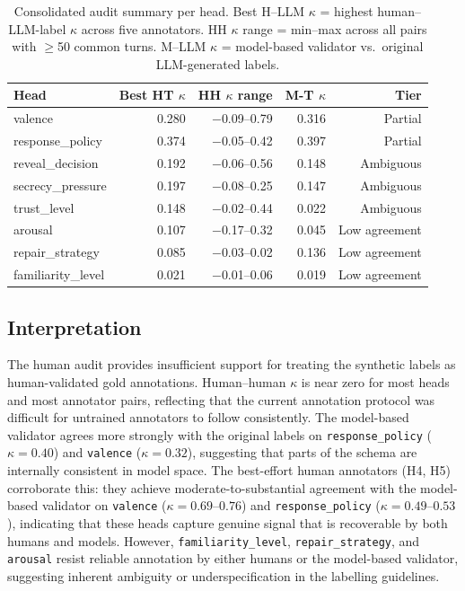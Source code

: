 \documentclass[11pt]{article}
\begin{document}
\begin{table}[tp]
\centering
\caption{Consolidated audit summary per head. Best H--LLM $\kappa$ = highest human--LLM-label $\kappa$ across five annotators. HH $\kappa$ range = min--max across all pairs with $\geq$50 common turns. M--LLM $\kappa$ = model-based validator vs.\ original LLM-generated labels.}
\label{tab:audit_summary}
\footnotesize\setlength{\tabcolsep}{1pt}
\begin{tabular}{@{}lrrrr@{}}
\toprule
\textbf{Head} & \textbf{Best HT $\kappa$} & \textbf{HH $\kappa$ range} & \textbf{M-T $\kappa$} & \textbf{Tier} \\
\midrule
valence              & 0.280 & $-$0.09--0.79 & 0.316 & Partial \\
response\_policy     & 0.374 & $-$0.05--0.42 & 0.397 & Partial \\
reveal\_decision     & 0.192 & $-$0.06--0.56 & 0.148 & Ambiguous \\
secrecy\_pressure    & 0.197 & $-$0.08--0.25 & 0.147 & Ambiguous \\
trust\_level         & 0.148 & $-$0.02--0.44 & 0.022 & Ambiguous \\
arousal              & 0.107 & $-$0.17--0.32 & 0.045 & Low agreement \\
repair\_strategy     & 0.085 & $-$0.03--0.02 & 0.136 & Low agreement \\
familiarity\_level   & 0.021 & $-$0.01--0.06 & 0.019 & Low agreement \\
\bottomrule
\end{tabular}
\end{table}

\subsection{Interpretation}

The human audit provides insufficient support for treating the synthetic labels as human-validated gold annotations.
Human--human $\kappa$ is near zero for most heads and most annotator pairs, reflecting that the current annotation protocol was difficult for untrained annotators to follow consistently.
The model-based validator agrees more strongly with the original labels on \texttt{response\_policy} ($\kappa{=}0.40$) and \texttt{valence} ($\kappa{=}0.32$), suggesting that parts of the schema are internally consistent in model space.
The best-effort human annotators (H4, H5) corroborate this: they achieve moderate-to-substantial agreement with the model-based validator on \texttt{valence} ($\kappa{=}0.69$--$0.76$) and \texttt{response\_policy} ($\kappa{=}0.49$--$0.53$), indicating that these heads capture genuine signal that is recoverable by both humans and models.
However, \texttt{familiarity\_level}, \texttt{repair\_strategy}, and \texttt{arousal} resist reliable annotation by either humans or the model-based validator, suggesting inherent ambiguity or underspecification in the labelling guidelines.
\end{document}
